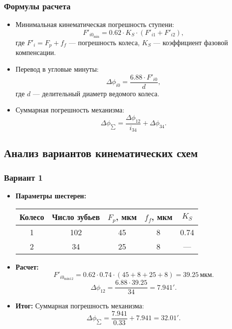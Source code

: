 \subsubsection*{Формулы расчета}
\begin{itemize}
    \item Минимальная кинематическая погрешность ступени:
        \[
        F'_{i0_{\text{min}}} = 0.62 \cdot K_S \cdot (F'_{i1} + F'_{i2}),
        \]
        где \( F'_i = F_p + f_f \) — погрешность колеса, \( K_S \) — коэффициент фазовой компенсации.
    \item Перевод в угловые минуты:
        \[
        \Delta\phi_{i0} = \frac{6.88 \cdot F'_{i0}}{d},
        \]
        где \( d \) — делительный диаметр ведомого колеса.
    \item Суммарная погрешность механизма:
        \[
        \Delta\phi_{\sum} = \frac{\Delta\phi_{12}}{i_{34}} + \Delta\phi_{34}.
        \]
\end{itemize}

\subsection{Анализ вариантов кинематических схем}
\subsubsection*{Вариант 1}
\begin{itemize}
    \item \textbf{Параметры шестерен:} 
        \begin{tabular}{|c|c|c|c|c|}
            \hline
            Колесо & Число зубьев & \( F_p \), мкм & \( f_f \), мкм & \( K_S \) \\ \hline
            1 & 102 & 45 & 8 & 0.74 \\ \hline
            2 & 34 & 25 & 8 & — \\ \hline
        \end{tabular}
    \item \textbf{Расчет:}
        \[
        F'_{i0_{\text{min12}}} = 0.62 \cdot 0.74 \cdot (45 + 8 + 25 + 8) = 39.25 \, \text{мкм}.
        \]
        \[
        \Delta\phi_{12} = \frac{6.88 \cdot 39.25}{34} = 7.941'.
        \]
    \item \textbf{Итог:} Суммарная погрешность механизма:
        \[
        \Delta\phi_{\sum} = \frac{7.941}{0.33} + 7.941 = 32.01'.
        \]
\end{itemize}

